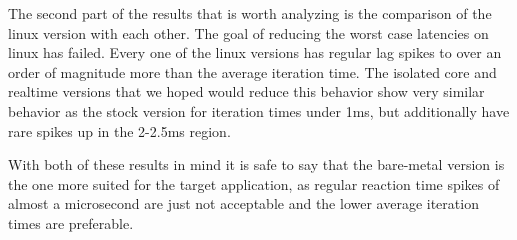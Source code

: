The second part of the results that is worth analyzing is the comparison of the linux version with each other.
The goal of reducing the worst case latencies on linux has failed.
Every one of the linux versions has regular lag spikes to over an order of magnitude more than the average iteration time.
The isolated core and realtime versions that we hoped would reduce this behavior show very similar behavior as the stock version for iteration times under 1ms,
but additionally have rare spikes up in the 2-2.5ms region.

With both of these results in mind it is safe to say that the bare-metal version is the one more suited for the target application,
as regular reaction time spikes of almost a microsecond are just not acceptable and the lower average iteration times are preferable.
